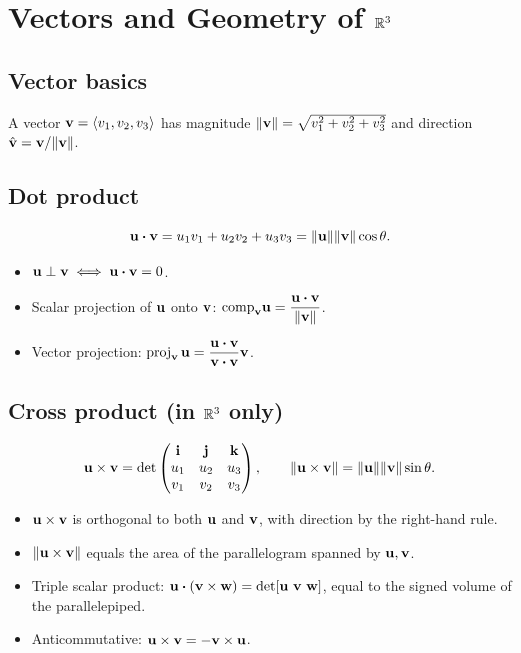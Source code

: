\section{Vectors and Geometry of $\mathbb{R}^3$}

\subsection{Vector basics}
A vector $\mathbf{v} = \langle v_1, v_2, v_3 \rangle$ has magnitude $\lVert \mathbf{v} \rVert = \sqrt{v_1^2 + v_2^2 + v_3^2}$ and direction $\hat{\mathbf{v}} = \mathbf{v} / \lVert \mathbf{v} \rVert$.

\subsection{Dot product}
\[ \mathbf{u} \boldsymbol\cdot \mathbf{v} = u_1 v_1 + u_2 v_2 + u_3 v_3 = \lVert \mathbf{u} \rVert \lVert \mathbf{v} \rVert \cos\theta. \]

\begin{itemize}[leftmargin=*,nosep]
  \item $\mathbf{u} \perp \mathbf{v} \iff \mathbf{u}\boldsymbol\cdot\mathbf{v} = 0$.
  \item Scalar projection of $\mathbf{u}$ onto $\mathbf{v}$: $\text{comp}_{\mathbf{v}} \mathbf{u} = \dfrac{\mathbf{u} \boldsymbol\cdot \mathbf{v}}{\lVert \mathbf{v} \rVert}$.
  \item Vector projection: $\operatorname{proj}_{\mathbf{v}} \mathbf{u} = \dfrac{\mathbf{u} \boldsymbol\cdot \mathbf{v}}{\mathbf{v} \boldsymbol\cdot \mathbf{v}} \mathbf{v}$.
\end{itemize}

\subsection{Cross product (in $\mathbb{R}^3$ only)}
\[ \mathbf{u} \times \mathbf{v} =
\det \begin{pmatrix} \mathbf{i} & \mathbf{j} & \mathbf{k} \\ u_1 & u_2 & u_3 \\ v_1 & v_2 & v_3 \end{pmatrix}, \qquad
\lVert \mathbf{u} \times \mathbf{v} \rVert = \lVert \mathbf{u} \rVert \lVert \mathbf{v} \rVert \sin\theta. \]

\begin{itemize}[leftmargin=*,nosep]
  \item $\mathbf{u} \times \mathbf{v}$ is orthogonal to both $\mathbf{u}$ and $\mathbf{v}$, with direction by the right-hand rule.
  \item $\lVert \mathbf{u} \times \mathbf{v} \rVert$ equals the area of the parallelogram spanned by $\mathbf{u}, \mathbf{v}$.
  \item Triple scalar product: $\mathbf{u} \boldsymbol\cdot (\mathbf{v} \times \mathbf{w}) = \det[\mathbf{u}\ \mathbf{v}\ \mathbf{w}]$, equal to the signed volume of the parallelepiped.
  \item Anticommutative: $\mathbf{u} \times \mathbf{v} = -\mathbf{v} \times \mathbf{u}$.
\end{itemize}

